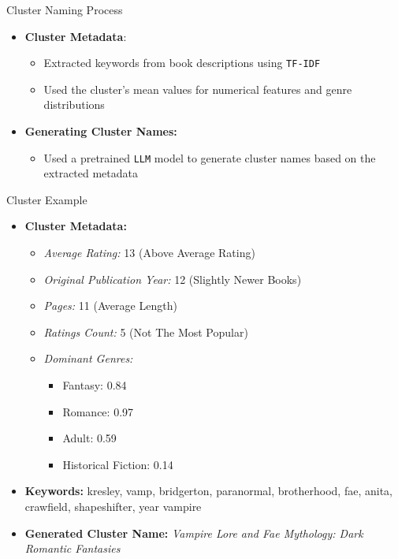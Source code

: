 \documentclass{beamer}
\begin{document}
\begin{frame}{Cluster Naming Process}
    \begin{itemize}
        \item \textbf{Cluster Metadata}:
            \begin{itemize}
                \item Extracted keywords from book descriptions using \texttt{TF-IDF}
                \item Used the cluster's mean values for numerical features and genre distributions
            \end{itemize}
        \item \textbf{Generating Cluster Names:}
            \begin{itemize}
                \item Used a pretrained \texttt{LLM} model to generate cluster names based on the extracted metadata
            \end{itemize}
    \end{itemize}
\end{frame}


\begin{frame}{Cluster Example}
    \begin{itemize}
        \item \textbf{Cluster Metadata:}
            \begin{itemize}
                \item \textit{Average Rating:} 13 (Above Average Rating)
                \item \textit{Original Publication Year:} 12 (Slightly Newer Books)
                \item \textit{Pages:} 11 (Average Length)
                \item \textit{Ratings Count:} 5 (Not The Most Popular)
                \item \textit{Dominant Genres:}
                    \begin{itemize}
                        \item Fantasy: 0.84
                        \item Romance: 0.97
                        \item Adult: 0.59
                        \item Historical Fiction: 0.14
                    \end{itemize}
            \end{itemize}
        \item \textbf{Keywords:} kresley, vamp, bridgerton, paranormal, brotherhood, fae, anita, crawfield, shapeshifter, year vampire
        \item \textbf{Generated Cluster Name:}
    \textit{Vampire Lore and Fae Mythology: Dark Romantic Fantasies}
    \end{itemize}
\end{frame}
\end{document}
